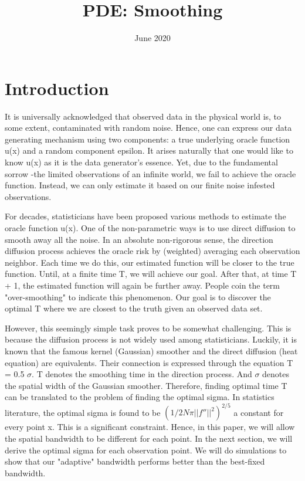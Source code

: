 \documentclass{article}
\title{PDE: Smoothing}
\date{June 2020}
\begin{document}
\maketitle

\section{Introduction}
 
It is universally acknowledged that observed data in the physical world is, to some extent, contaminated with random noise. Hence, one can express our data generating mechanism using two components: a true underlying oracle function u(x) and a random component epsilon. It arises naturally that one would like to know u(x) as it is the data generator's essence. Yet, due to the fundamental sorrow -the limited observations of an infinite world, we fail to achieve the oracle function. Instead, we can only estimate it based on our finite noise infested observations. 

For decades, statisticians have been proposed various methods to estimate the oracle function u(x). One of the non-parametric ways is to use direct diffusion to smooth away all the noise. In an absolute non-rigorous sense, the direction diffusion process achieves the oracle risk by (weighted) averaging each observation neighbor. Each time we do this, our estimated function will be closer to the true function. Until, at a finite time T, we will achieve our goal. After that, at time T + 1, the estimated function will again be further away. People coin the term "over-smoothing" to indicate this phenomenon. Our goal is to discover the optimal T where we are closest to the truth given an observed data set. 

However, this seemingly simple task proves to be somewhat challenging. This is because the diffusion process is not widely used among statisticians. Luckily, it is known that the famous kernel (Gaussian) smoother and the direct diffusion (heat equation) are equivalents. Their connection is expressed through the equation T = 0.5 $\sigma$. T denotes the smoothing time in the direction process. And $\sigma$ denotes the spatial width of the Gaussian smoother. Therefore, finding optimal time T can be translated to the problem of finding the optimal sigma. In statistics literature, the optimal sigma is found to be $(1/2N\pi||f''||^2)^{2/5}$ a constant for every point x. This is a significant constraint. Hence, in this paper, we will allow the spatial bandwidth to be different for each point. In the next section, we will derive the optimal sigma for each observation point. We will do simulations to show that our "adaptive" bandwidth performs better than the best-fixed bandwidth. 
\end{document}
